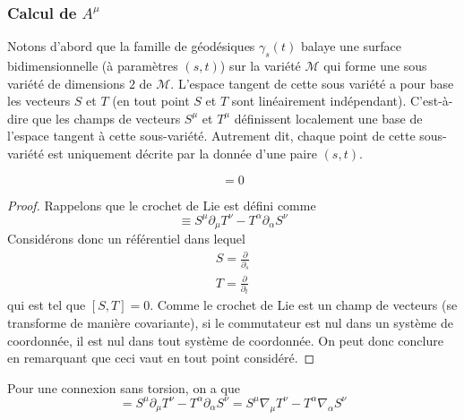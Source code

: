 \subsubsection{Calcul de $A^\mu$}
Notons d'abord que la famille de géodésiques $\gamma_{s}(t)$ balaye une surface bidimensionnelle (à paramètres $(s,t)$) sur la variété $\mathcal{M}$ qui forme une sous variété de dimensions $2$ de $\mathcal{M}$. L'espace tangent de cette sous variété a pour base les vecteurs $S$ et $T$ (en tout point $S$ et $T$ sont linéairement indépendant). C'est-à-dire que les champs de vecteurs $S^{\mu}$ et $T^{\mu}$ définissent localement une base de l'espace tangent à cette sous-variété. Autrement dit, chaque point de cette sous-variété est uniquement décrite par la donnée d'une paire $(s,t)$.
\begin{theoremframe}
    \begin{propri} 
        \begin{equation}
            [S,T] = 0
        \end{equation}
    \end{propri}
\end{theoremframe}
\begin{proof}

Rappelons que le crochet de Lie est défini comme
\begin{equation}
[S,T] \equiv S^{\mu}\partial_{\mu}T^{\nu} - T^{\alpha}\partial_{\alpha}S^{\nu}
\end{equation}
Considérons donc un référentiel dans lequel
\begin{align}
    S = \frac{\partial}{\partial_{s}}\\
    T = \frac{\partial}{\partial_{t}}
\end{align}
qui est tel que $[S, T] = 0$. Comme le crochet de Lie est un champ de vecteurs (se transforme de manière covariante), si le commutateur est nul dans un système de coordonnée, il est nul dans tout système de coordonnée. On peut donc conclure en remarquant que ceci vaut en tout point considéré.
\end{proof}
\begin{theoremframe}
    \begin{propri}
        Pour une connexion sans torsion, on a que 
        \begin{equation}
            [S,T] = S^{\mu}\partial_{\mu}T^{\nu} - T^{\alpha}\partial_{\alpha}S^{\nu} = S^{\mu}\nabla_{\mu}T^{\nu} - T^{\alpha}\nabla_{\alpha}S^{\nu}
        \end{equation}
    \end{propri}
\end{theoremframe}
